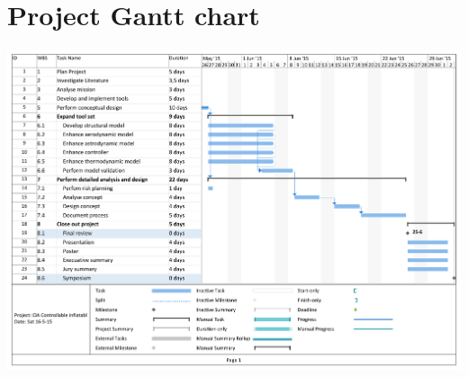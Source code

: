 \section{Project Gantt chart} \label{app:gantt}

\label{fig:GanttChart}
\includegraphics[angle=90,origin=c,width=0.9\linewidth]{Figure/GanttChartV3.pdf}
